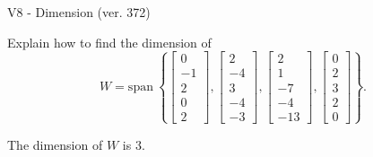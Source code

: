 \begin{exercise}
  \begin{exerciseTitle}V8 - Dimension (ver. 372)\end{exerciseTitle}
  \begin{exerciseStatement}
    Explain how to find the dimension of 
\[W=\mathrm{span}\ \left\{\left[\begin{array}{r}
0 \\
-1 \\
2 \\
0 \\
2
\end{array}\right] , \left[\begin{array}{r}
2 \\
-4 \\
3 \\
-4 \\
-3
\end{array}\right] , \left[\begin{array}{r}
2 \\
1 \\
-7 \\
-4 \\
-13
\end{array}\right] , \left[\begin{array}{r}
0 \\
2 \\
3 \\
2 \\
0
\end{array}\right]\right\}.\]



  \end{exerciseStatement}
  \begin{exerciseAnswer}
   The dimension of \(W\) is  \(3\).
  


  \end{exerciseAnswer}
\end{exercise}